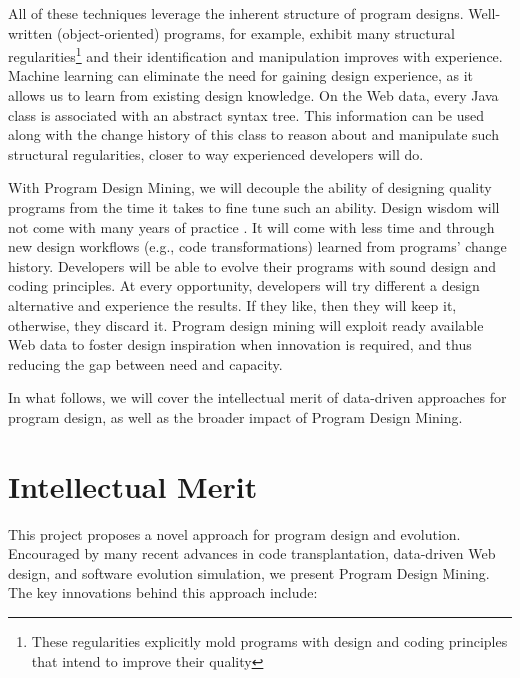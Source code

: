 All of these techniques leverage the inherent structure of program designs. 
Well-written (object-oriented) programs, for example, exhibit many structural 
regularities\footnote{These regularities explicitly mold programs with design 
and coding principles that intend to improve their quality} and their 
identification and manipulation improves with experience. Machine learning 
can eliminate the need for gaining design experience, as it allows us to learn 
from existing design knowledge. On the Web data, every Java class is associated 
with an abstract syntax tree. This information can be used along with the change 
history of this class to reason about and manipulate such structural regularities, 
closer to way experienced developers will do. 

With Program Design Mining, we will decouple the ability of designing quality 
programs from the time it takes to fine tune such an ability. Design wisdom 
will not come with many years of practice \cite{weiser1983programming, 
winslow1996programming}. It will come with less time and through new design 
workflows (e.g., code transformations) learned from programs' change 
history. Developers will be able to evolve their programs with sound design and 
coding principles. At every opportunity, developers will try different a design 
alternative and experience the results. If they like, then they will keep it, 
otherwise, they discard it. Program design mining will exploit ready available 
Web data to foster design inspiration when innovation is required, and thus 
reducing the gap between need and capacity.

In what follows, we will cover the intellectual merit of data-driven 
approaches for program design, as well as the broader impact of Program 
Design Mining.

\section*{Intellectual Merit} %
\label{sec:merit}

This project proposes a novel approach for program design and 
evolution. Encouraged by many recent advances in code transplantation, 
data-driven Web design, and software evolution simulation, we 
present Program Design Mining. The key innovations behind this 
approach include:

